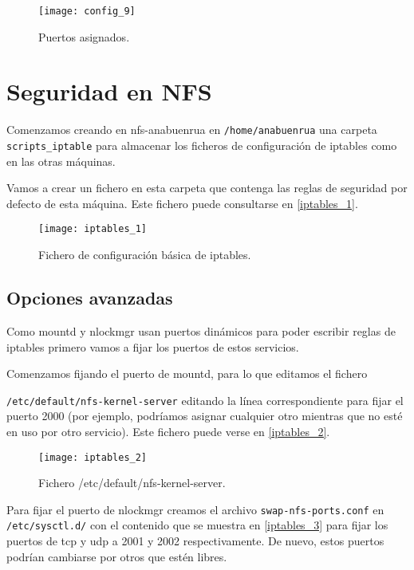 \begin{figure}[h!]
\begin{center}
\caption{Puertos asignados.}
\label{config_10}
\texttt{[image: config\_9]}
\end{center}
\end{figure}

\chapter{Seguridad en NFS}

Comenzamos creando en nfs-anabuenrua en \verb|/home/anabuenrua| una carpeta \verb|scripts_iptable| para almacenar los ficheros de configuración de iptables como en las otras máquinas.

Vamos a crear un fichero en esta carpeta que contenga las reglas de seguridad por defecto de esta máquina. Este fichero puede consultarse en \eqref{iptables_1}.

\begin{figure}[h!]
\begin{center}
\caption{Fichero de configuración básica de iptables.}
\label{iptables_1}
\texttt{[image: iptables\_1]}
\end{center}
\end{figure}

\section{Opciones avanzadas}

Como mountd y nlockmgr usan puertos dinámicos para poder escribir reglas de iptables primero vamos a fijar los puertos de estos servicios.

Comenzamos fijando el puerto de mountd, para lo que editamos el fichero 

\verb|/etc/default/nfs-kernel-server| editando la línea correspondiente para fijar el puerto 2000 (por ejemplo, podríamos asignar cualquier otro mientras que no esté en uso por otro servicio). Este fichero puede verse en \eqref{iptables_2}.

\begin{figure}[h!]
\begin{center}
\caption{Fichero /etc/default/nfs-kernel-server.}
\label{iptables_2}
\texttt{[image: iptables\_2]}
\end{center}
\end{figure}

Para fijar el puerto de nlockmgr creamos el archivo \verb|swap-nfs-ports.conf| en \verb|/etc/sysctl.d/| con el contenido que se muestra en \eqref{iptables_3} para fijar los puertos de tcp y udp a 2001 y 2002 respectivamente. De nuevo, estos puertos podrían cambiarse por otros que estén libres.


